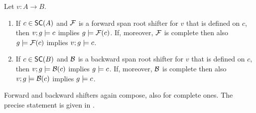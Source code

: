 \begin{proposition}
Let $v:A\to B$.
\begin{enumerate}[topsep=\smallskipamount]
\item If $c\in \SC A$ and $\mathcal{F}$ is a forward span root shifter for $v$ that is defined on $c$, then $v;g\models c$ implies $g\models \mathcal{F}(c)$. If, moreover, $\mathcal{F}$ is complete then also $g\models \mathcal{F}(c)$ implies $v;g\models c$.
\item If $c\in \SC B$ and $\mathcal{B}$ is a backward span root shifter for $v$ that is defined on $c$, then $v;g\models \mathcal{B}(c)$ implies $g\models c$. If, moreover, $\mathcal{B}$ is complete then also $v;g\models \mathcal{B}(c)$ implies $g\models c$.
\end{enumerate}
\end{proposition}
%
Forward and backward shifters again compose, also for complete ones.
\iffest
The precise statement is given in .
\fi

